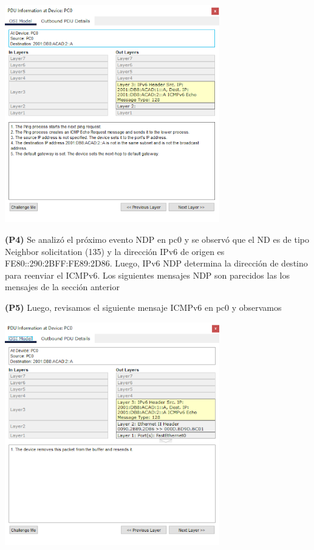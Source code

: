 \documentclass[12pt]{article}
\begin{document}
\begin{center}
	 \includegraphics[width=0.7\textwidth]{../tpipv6/imagenes/imagen1}
\end{center}
 
 \textbf{(P4)} Se analizó el próximo evento NDP en pc0 y se observó que el ND es de tipo Neighbor solicitation (135) y la dirección IPv6 de origen es FE80::290:2BFF:FE89:2D86. Luego, IPv6 NDP determina la dirección de destino para reenviar el ICMPv6. Los siguientes mensajes NDP son parecidos las los mensajes de la sección anterior
 
 \textbf{(P5)} Luego, revisamos el siguiente mensaje ICMPv6 en pc0 y observamos
 
\begin{center}
	 \includegraphics[width=0.7\textwidth]{../tpipv6/imagenes/imagen2}
\end{center}
 
\end{document}
